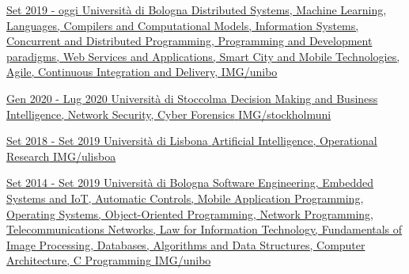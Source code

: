 \documentclass[paper=a4,fontsize=11pt, hidelinks]{temp} %
\begin{document}
\href{https://corsi.unibo.it/2cycle/ComputerScienceEngineering}{
{Set 2019 - oggi}
{Università di Bologna}
{Distributed Systems, Machine Learning,    Languages, Compilers and Computational Models,    Information Systems,     Concurrent and Distributed Programming,    Programming and Development paradigms,    Web Services and Applications,     Smart City and Mobile Technologies,     Agile, Continuous Integration and Delivery,  } 
 {IMG/unibo}
}
\sepspace

\href{https://dsv.su.se/en/}{
{Gen 2020 - Lug 2020}
{Università di Stoccolma}
{Decision Making and Business Intelligence, Network Security, Cyber Forensics}
{IMG/stockholmuni}
}
\sepspace

\href{https://ciencias.ulisboa.pt/en}{
{Set 2018 - Set 2019}
{Università di Lisbona}
{Artificial Intelligence, Operational Research} 
{IMG/ulisboa}
}
\sepspace

\href{https://corsi.unibo.it/1cycle/ComputerScienceEngineering}{
{Set 2014 - Set 2019}
{Università di Bologna}
{Software Engineering, Embedded Systems and IoT, Automatic Controls, Mobile Application Programming, Operating Systems, Object-Oriented Programming, Network Programming, Telecommunications Networks, Law for Information Technology, Fundamentals of Image Processing, Databases, Algorithms and Data Structures, Computer Architecture, C Programming} 
{IMG/unibo}
}
\end{document}

